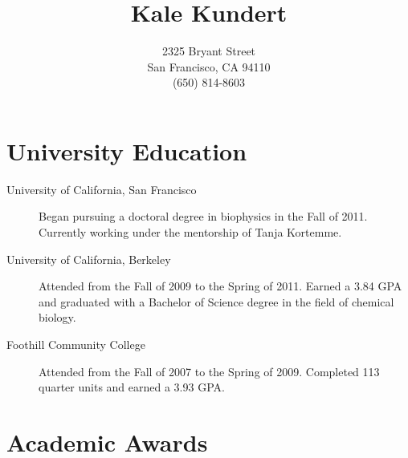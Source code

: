 \documentclass{article}
\title{Kale Kundert}
\author{2325 Bryant Street\\San Francisco, CA 94110\\(650) 814-8603}
\date{}
\begin{document}
 \maketitle

 \pagestyle{empty}
 \thispagestyle{empty}



 \section*{University Education}

  \begin{description}
   \item[University of California, San Francisco] Began pursuing a doctoral 
   degree in biophysics in the Fall of 2011.  Currently working under the 
   mentorship of Tanja Kortemme.
   
   \item[University of California, Berkeley] Attended from the Fall of 2009 to
   the Spring of 2011.  Earned a 3.84 GPA and graduated with a Bachelor of 
   Science degree in the field of chemical biology.
   
   \item[Foothill Community College] Attended from the Fall of 2007 to the
   Spring of 2009.  Completed 113 quarter units and earned a 3.93 GPA.
  \end{description}

 \section*{Academic Awards}
\end{document}
